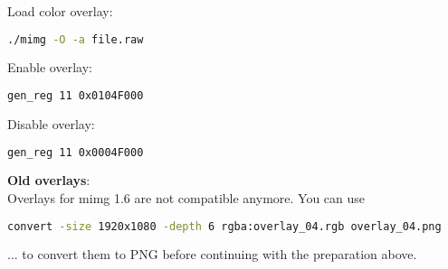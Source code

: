 Load color overlay: 

\begin{lstlisting}[language=bash,morekeywords=$,keywordstyle=\bfseries,frame=none,xleftmargin=.25in,belowskip=2em, aboveskip=2em]
./mimg -O -a file.raw
\end{lstlisting} 


Enable overlay: 

\begin{lstlisting}[language=bash,morekeywords=$,keywordstyle=\bfseries,frame=none,xleftmargin=.25in,belowskip=2em, aboveskip=2em]
gen_reg 11 0x0104F000
\end{lstlisting} 


Disable overlay: 

\begin{lstlisting}[language=bash,morekeywords=$,keywordstyle=\bfseries,frame=none,xleftmargin=.25in,belowskip=2em, aboveskip=2em]
gen_reg 11 0x0004F000
\end{lstlisting} 


\textbf{Old overlays}:\\

Overlays for mimg 1.6 are not compatible anymore. You can use

\begin{lstlisting}[language=bash,morekeywords=$,keywordstyle=\bfseries,frame=none,xleftmargin=.25in,belowskip=2em, aboveskip=2em]
convert -size 1920x1080 -depth 6 rgba:overlay_04.rgb overlay_04.png
\end{lstlisting} 

... to convert them to PNG before continuing with the preparation above. 